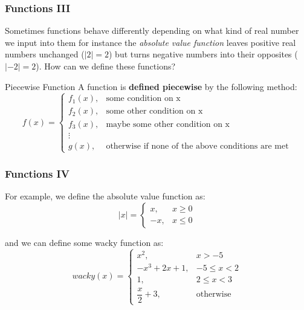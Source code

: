 \documentclass{ltx-talk}
\begin{document}
\begin{frame}
  \frametitle{Functions III}

  Sometimes functions behave differently depending on what kind of real number we input into them \pause
  for instance the \textit{absolute value function} \pause
  leaves positive real numbers unchanged ($|2| = 2$)
  but turns negative numbers into their opposites ($|-2| = 2$). \pause
  How can we define these functions?

  \begin{block}{Piecewise Function}
    A function is \textbf{defined piecewise} by
    the following method: \pause
    \begin{equation}
      f(x) = \begin{cases} f_1(x), & \text{some condition on x} \\
        f_2(x), & \text{some other condition on x} \\
        f_3(x), & \text{maybe some other condition on x} \\
        \vdots \\
        g(x), & \text{otherwise if none of the above conditions are met}
      \end{cases}
    \end{equation} \pause
  \end{block}
\end{frame}
\begin{frame}
  \frametitle{Functions IV}
  For example, we define the absolute value function as: \pause
  \begin{equation}
    |x| = \begin{cases} x, & x \geq 0 \\ -x, & x \leq 0 \end{cases}
  \end{equation} \pause

  and we can define some wacky function as: \pause
  \begin{equation}
    wacky(x) = \begin{cases} x^2, & x > -5 \\ -x^3 + 2x + 1, & -5 \leq x < 2 \\ 1, & 2 \leq x < 3 \\ \dfrac{x}{2} + 3, & \text{otherwise} \end{cases} 
  \end{equation}
\end{frame}
\end{document}
